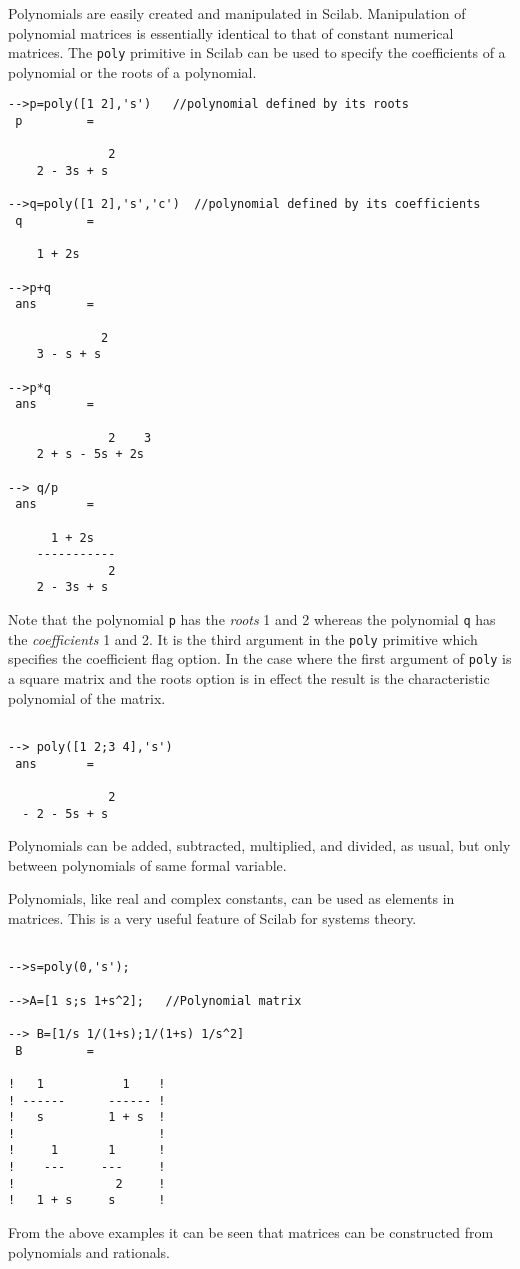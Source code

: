 	Polynomials are easily created and manipulated in Scilab.
Manipulation of polynomial matrices is essentially identical
to that of constant numerical matrices.
The {\tt poly} 
primitive in Scilab can be used to specify the coefficients
of a polynomial or the roots of a polynomial.
\begin{verbatim}
-->p=poly([1 2],'s')   //polynomial defined by its roots
 p         =
 
              2  
    2 - 3s + s   
 
-->q=poly([1 2],'s','c')  //polynomial defined by its coefficients
 q         =
 
    1 + 2s   
 
-->p+q
 ans       =
 
             2  
    3 - s + s   
 
-->p*q
 ans       =
 
              2    3  
    2 + s - 5s + 2s   
 
--> q/p
 ans       =
 
      1 + 2s     
    -----------  
              2  
    2 - 3s + s   
\end{verbatim}
Note that the polynomial {\tt p} has the {\em roots}
1 and 2 whereas the polynomial {\tt q} has the {\em coefficients}
1 and 2.  It is the third argument in the {\tt poly} primitive which
specifies the coefficient flag option.  
In the case where the first argument of {\tt poly} is a square matrix
and the roots option is in effect the result is the characteristic
polynomial of the matrix.
\begin{verbatim}
 
--> poly([1 2;3 4],'s')
 ans       =
 
              2  
  - 2 - 5s + s   
\end{verbatim}
Polynomials can be added,
subtracted, multiplied, and divided, as usual, but only between polynomials
of same formal variable.

	Polynomials, like real and complex constants, can be used
as elements in matrices.  This is a very useful feature of Scilab
for systems theory.
\begin{verbatim}
 
-->s=poly(0,'s');
 
-->A=[1 s;s 1+s^2];   //Polynomial matrix
 
--> B=[1/s 1/(1+s);1/(1+s) 1/s^2]
 B         =
 
!   1           1    !
! ------      ------ !
!   s         1 + s  !
!                    !
!     1       1      !
!    ---     ---     !
!              2     !
!   1 + s     s      !

\end{verbatim}
From the above examples it can be seen that matrices can be constructed
from polynomials and rationals.

